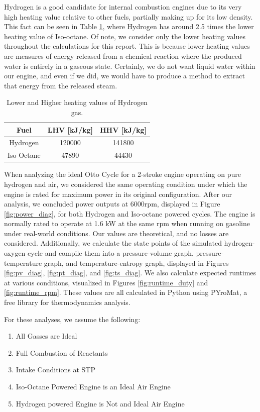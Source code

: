 \documentclass[conf]{new-aiaa}
\begin{document}
Hydrogen is a good candidate for internal combustion engines due to its very high heating value relative to other fuels, partially making up for its low density. This fact can be seen in Table \ref{tab:heating_vals}, where Hydrogen has around 2.5 times the lower heating value of Iso-octane. Of note, we consider only the lower heating values throughout the calculations for this report. This is because lower heating values are measures of energy released from a chemical reaction where the produced water is entirely in a gaseous state. Certainly, we do not want liquid water within our engine, and even if we did, we would have to produce a method to extract that energy from the released steam.

\begin{table}[H]
    \centering
    \begin{tabular}{|c|c|c|}
    \hline
    Fuel & LHV [kJ/kg] & HHV [kJ/kg]\\ \hline
    Hydrogen &  120000 & 141800 \\ \hline
    Iso Octane & 47890 & 44430\\ \hline
    \end{tabular}
    \caption{Lower and Higher heating values of Hydrogen gas. \cite{class_notes}}
    \label{tab:heating_vals}
\end{table}

When analyzing the ideal Otto Cycle for a 2-stroke engine operating on pure hydrogen and air, we considered the same operating condition under which the engine is rated for maximum power in its original configuration. After our analysis, we concluded power outputs at 6000rpm, displayed in Figure \ref{fig:power_diag}, for both Hydrogen and Iso-octane powered cycles. The engine is normally rated to operate at 1.6 kW at the same rpm when running on gasoline under real-world conditions. Our values are theoretical, and no losses are considered. Additionally, we calculate the state points of the simulated hydrogen-oxygen cycle and compile them into a pressure-volume graph, pressure-temperature graph, and temperature-entropy graph, displayed in Figures \ref{fig:pv_diag}, \ref{fig:pt_diag}, and \ref{fig:ts_diag}. We also calculate expected runtimes at various conditions, visualized in Figures \ref{fig:runtime_duty} and \ref{fig:runtime_rpm}. These values are all calculated in Python using PYroMat, a free library for thermodynamics analysis.\cite{pyromat}

For these analyses, we assume the following:

\begin{enumerate}
    \item All Gasses are Ideal
    \item Full Combustion of Reactants
    \item Intake Conditions at STP
    \item Iso-Octane Powered Engine is an Ideal Air Engine
    \item Hydrogen powered Engine is Not and Ideal Air Engine
\end{enumerate}
\end{document}
